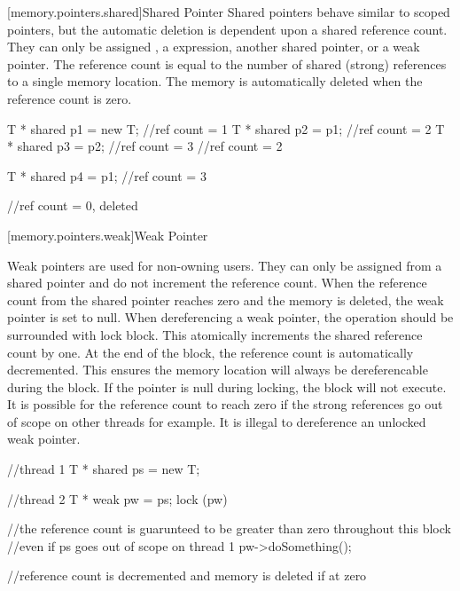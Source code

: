 [memory.pointers.shared]{Shared Pointer}
Shared pointers behave similar to scoped pointers, but the automatic deletion is dependent upon a shared reference count. They can only be assigned , a  expression, another shared pointer, or a weak pointer. The reference count is equal to the number of shared (strong) references to a single memory location. The memory is automatically deleted when the reference count is zero.

\begin{codeblock}

{
	T * shared p1 = new T;	//ref count = 1
	T * shared p2 = p1;		//ref count = 2
	{
		T * shared p3 = p2;	//ref count = 3
	} //ref count = 2

	T * shared p4 = p1;	//ref count = 3
} //ref count = 0, deleted

\end{codeblock}

[memory.pointers.weak]{Weak Pointer}

Weak pointers are used for non-owning users. They can only be assigned from a shared pointer and do not increment the reference count. When the reference count from the shared pointer reaches zero and the memory is deleted, the weak pointer is set to null. When dereferencing a weak pointer, the operation should be surrounded with lock block. This atomically increments the shared reference count by one. At the end of the block, the reference count is automatically decremented. This ensures the memory location will always be dereferencable during the block. If the pointer is null during locking, the block will not execute. It is possible for the reference count to reach zero if the strong references go out of scope on other threads for example. It is illegal to dereference an unlocked weak pointer.

\begin{codeblock}

//thread 1
T * shared ps = new T;


//thread 2
T * weak pw = ps;
lock (pw)	
{
	//the reference count is guarunteed to be greater than zero throughout this block
	//even if ps goes out of scope on thread 1
	pw->doSomething();
	
} //reference count is decremented and memory is deleted if at zero


\end{codeblock}